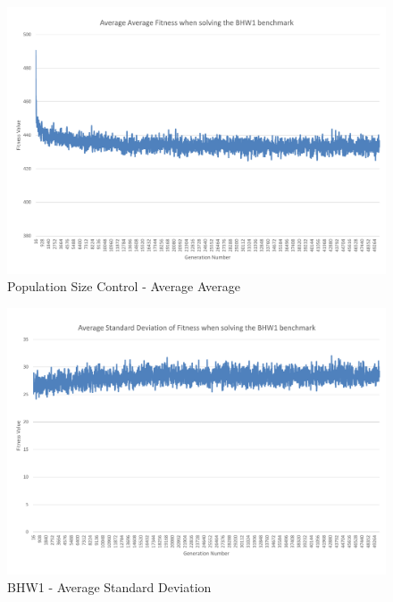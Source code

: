 \begin{landscape}
\begin{figure}[thbp]
	\centerline{\includegraphics[height=0.945\textwidth]{figures/BHW1_graphs/BHW1_average_average.pdf}}
	\caption{Population Size Control - Average Average}
	\label{fig:bhw1aa}
\end{figure}
\end{landscape}

\begin{landscape}
\begin{figure}[thbp]
	\centerline{\includegraphics[height=0.945\textwidth]{figures/BHW1_graphs/BHW1_average_standard_deviation.pdf}}
	\caption{BHW1 - Average Standard Deviation}
	\label{fig:bhw1astd}
\end{figure}
\end{landscape}

